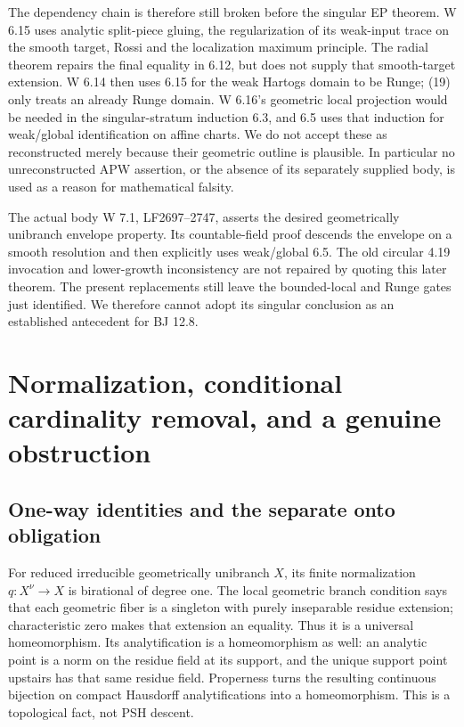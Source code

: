 \documentclass[
  11pt,
]{article}
\begin{document}
The dependency chain is therefore still broken before the singular EP
theorem. W 6.15 uses analytic split-piece gluing, the regularization of
its weak-input trace on the smooth target, Rossi and the localization
maximum principle. The radial theorem repairs the final equality in
6.12, but does not supply that smooth-target extension. W 6.14 then uses
6.15 for the weak Hartogs domain to be Runge; (19) only treats an
already Runge domain. W 6.16's geometric local projection would be
needed in the singular-stratum induction 6.3, and 6.5 uses that
induction for weak/global identification on affine charts. We do not
accept these as reconstructed merely because their geometric outline is
plausible. In particular no unreconstructed APW assertion, or the
absence of its separately supplied body, is used as a reason for
mathematical falsity.

The actual body W 7.1, LF2697--2747, asserts the desired geometrically
unibranch envelope property. Its countable-field proof descends the
envelope on a smooth resolution and then explicitly uses weak/global
6.5. The old circular 4.19 invocation and lower-growth inconsistency are
not repaired by quoting this later theorem. The present replacements
still leave the bounded-local and Runge gates just identified. We
therefore cannot adopt its singular conclusion as an established
antecedent for BJ 12.8.

\section{Normalization, conditional cardinality removal, and a genuine
obstruction}\label{normalization-conditional-cardinality-removal-and-a-genuine-obstruction}

\subsection{One-way identities and the separate onto
obligation}\label{one-way-identities-and-the-separate-onto-obligation}

For reduced irreducible geometrically unibranch \(X\), its finite
normalization \(q:X^\nu\to X\) is birational of degree one. The local
geometric branch condition says that each geometric fiber is a singleton
with purely inseparable residue extension; characteristic zero makes
that extension an equality. Thus it is a universal homeomorphism. Its
analytification is a homeomorphism as well: an analytic point is a norm
on the residue field at its support, and the unique support point
upstairs has that same residue field. Properness turns the resulting
continuous bijection on compact Hausdorff analytifications into a
homeomorphism. This is a topological fact, not PSH descent.
\end{document}
